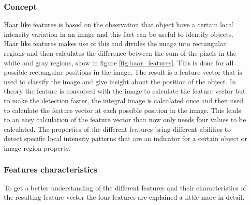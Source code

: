 \subsubsection{Concept}
Haar like features is based on the observation that object have a certain local intensity variation in an image and this fact can be useful to identify objects. Haar like features makes use of this and divides the image into rectangular regions and then calculates the difference between the sum of the pixels in the white and gray regions, show in figure \ref{fig:haar_features}. This is done for all possible rectangular positions in the image. The result is a feature vector that is used to classify the image and give insight about the position of the object. In theory the feature is convolved with the image to calculate the feature vector but to make the detection faster, the integral image is calculated once and then used to calculate the feature vector at each possible position in the image.
 This leads to an easy calculation of the feature vector than now only needs four values to be calculated. 
The properties of the different features bring different abilities to detect specific local intensity patterns that are an indicator for a certain object or image region property. 
\subsubsection{Features characteristics}
To get a better understanding of the different features and their characteristics of the resulting feature vector the four features are explained a little more in detail. 

